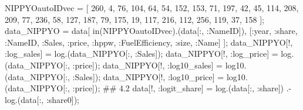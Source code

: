 \documentclass[
  letterpaper,
  DIV=11,
  numbers=noendperiod]{scrreprt}
\newenvironment{Shaded}{\begin{snugshade}}{\end{snugshade}}
\newcommand{\CommentTok}[1]{\textcolor[rgb]{0.37,0.37,0.37}{#1}}
\newcommand{\FloatTok}[1]{\textcolor[rgb]{0.68,0.00,0.00}{#1}}
\newcommand{\FunctionTok}[1]{\textcolor[rgb]{0.28,0.35,0.67}{#1}}
\newcommand{\NormalTok}[1]{\textcolor[rgb]{0.00,0.23,0.31}{#1}}
\newcommand{\OperatorTok}[1]{\textcolor[rgb]{0.37,0.37,0.37}{#1}}
\begin{document}
\begin{Shaded}
\begin{Highlighting}[]
\NormalTok{NIPPYOautoIDvec }\OperatorTok{=}\NormalTok{ [}
    \FloatTok{260}\NormalTok{, }\FloatTok{4}\NormalTok{, }\FloatTok{76}\NormalTok{, }\FloatTok{104}\NormalTok{, }\FloatTok{64}\NormalTok{, }\FloatTok{54}\NormalTok{, }\FloatTok{152}\NormalTok{, }\FloatTok{153}\NormalTok{, }\FloatTok{71}\NormalTok{, }\FloatTok{197}\NormalTok{,}
    \FloatTok{42}\NormalTok{, }\FloatTok{45}\NormalTok{, }\FloatTok{114}\NormalTok{, }\FloatTok{208}\NormalTok{, }\FloatTok{209}\NormalTok{, }\FloatTok{77}\NormalTok{, }\FloatTok{236}\NormalTok{, }\FloatTok{58}\NormalTok{, }\FloatTok{127}\NormalTok{, }\FloatTok{187}\NormalTok{,}
    \FloatTok{79}\NormalTok{, }\FloatTok{175}\NormalTok{, }\FloatTok{19}\NormalTok{, }\FloatTok{117}\NormalTok{, }\FloatTok{216}\NormalTok{, }\FloatTok{112}\NormalTok{, }\FloatTok{256}\NormalTok{, }\FloatTok{119}\NormalTok{, }\FloatTok{37}\NormalTok{, }\FloatTok{158}
\NormalTok{];}
\NormalTok{data\_NIPPYO }\OperatorTok{=}\NormalTok{ data[}
    \FunctionTok{in}\NormalTok{(NIPPYOautoIDvec).(data[}\OperatorTok{:}\NormalTok{, }\OperatorTok{:}\NormalTok{NameID]), }
\NormalTok{    [}\OperatorTok{:}\NormalTok{year, }\OperatorTok{:}\NormalTok{share, }\OperatorTok{:}\NormalTok{NameID, }\OperatorTok{:}\NormalTok{Sales, }\OperatorTok{:}\NormalTok{price, }\OperatorTok{:}\NormalTok{hppw, }\OperatorTok{:}\NormalTok{FuelEfficiency, }\OperatorTok{:}\NormalTok{size, }\OperatorTok{:}\NormalTok{Name]}
\NormalTok{    ];}
\NormalTok{data\_NIPPYO[!, }\OperatorTok{:}\NormalTok{log\_sales] }\OperatorTok{=} \FunctionTok{log}\NormalTok{.(data\_NIPPYO[}\OperatorTok{:}\NormalTok{, }\OperatorTok{:}\NormalTok{Sales]);}
\NormalTok{data\_NIPPYO[!, }\OperatorTok{:}\NormalTok{log\_price] }\OperatorTok{=} \FunctionTok{log}\NormalTok{.(data\_NIPPYO[}\OperatorTok{:}\NormalTok{, }\OperatorTok{:}\NormalTok{price]);}
\NormalTok{data\_NIPPYO[!, }\OperatorTok{:}\NormalTok{log10\_sales] }\OperatorTok{=} \FunctionTok{log10}\NormalTok{.(data\_NIPPYO[}\OperatorTok{:}\NormalTok{, }\OperatorTok{:}\NormalTok{Sales]);}
\NormalTok{data\_NIPPYO[!, }\OperatorTok{:}\NormalTok{log10\_price] }\OperatorTok{=} \FunctionTok{log10}\NormalTok{.(data\_NIPPYO[}\OperatorTok{:}\NormalTok{, }\OperatorTok{:}\NormalTok{price]);}
\CommentTok{\#\# 4.2}
\NormalTok{data[!, }\OperatorTok{:}\NormalTok{logit\_share] }\OperatorTok{=} \FunctionTok{log}\NormalTok{.(data[}\OperatorTok{:}\NormalTok{, }\OperatorTok{:}\NormalTok{share]) }\OperatorTok{.{-}} \FunctionTok{log}\NormalTok{.(data[}\OperatorTok{:}\NormalTok{, }\OperatorTok{:}\NormalTok{share0]);}


\end{Highlighting}
\end{Shaded}
\end{document}
